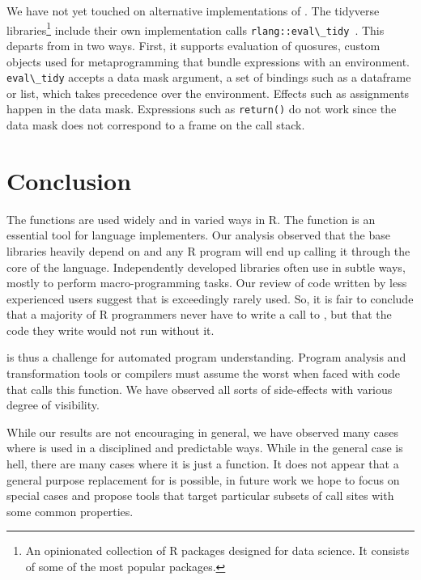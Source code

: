 \documentclass[review,screen,acmsmall]{acmart}%
\renewcommand{\k}[1]{\lstinline |#1|\xspace}
\begin{document}

We have not yet touched on alternative implementations of \eval. The tidyverse
libraries\footnote{An opinionated collection of R packages designed for data
science. It consists of some of the most popular packages.} include their own
implementation calls \k{rlang::eval\_tidy}~\cite{tidyverse}. This departs from
\eval in two ways. First, it supports evaluation of quosures, custom objects
used for metaprogramming that bundle expressions with an environment.
\k{eval\_tidy} accepts a data mask argument, a set of bindings such as a
dataframe or list, which takes precedence over the environment. Effects such as
assignments happen in the data mask. Expressions such as \k{return()} do not
work since the data mask does not correspond to a frame on the call stack.

\section{Conclusion}

The \eval functions are used widely and in varied ways in R. The function is an
essential tool for language implementers. Our analysis observed that the base
libraries heavily depend on \eval and any R program will end up calling it
through the core of the language. Independently developed libraries often use
\eval in subtle ways, mostly to perform macro-programming tasks. Our review of
code written by less experienced users suggest that \eval is exceedingly rarely
used. So, it is fair to conclude that a majority of R programmers never have to
write a call to \eval, but that the code they write would not run without it.

\Eval is thus a challenge for automated program understanding. Program analysis
and transformation tools or compilers must assume the worst when faced with code
that calls this function. We have observed all sorts of side-effects with
various degree of visibility.

While our results are not encouraging in general, we have observed many cases
where \eval is used in a disciplined and predictable ways. While in the general
case \eval is hell, there are many cases where it is just a function. It does
not appear that a general purpose replacement for \eval is possible, in future
work we hope to focus on special cases and propose tools that target particular
subsets of call sites with some common properties.



\end{document}
